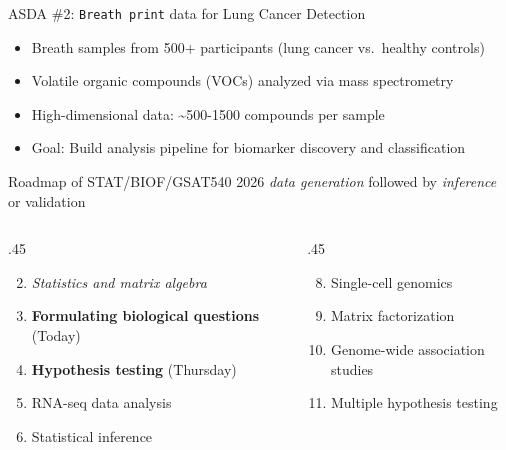 \documentclass[
  12pt,
  ignorenonframetext,
  aspectratio=169]{beamer}
\begin{document}
\begin{frame}{ASDA \#2: \texttt{Breath\ print} data for Lung Cancer
Detection}
\protect{}\label{asda-2-breath-print-data-for-lung-cancer-detection}
\begin{itemize}
\item
  Breath samples from 500+ participants (lung cancer vs.~healthy
  controls)
\item
  Volatile organic compounds (VOCs) analyzed via mass spectrometry
\item
  High-dimensional data: \textasciitilde500-1500 compounds per sample
\item
  Goal: Build analysis pipeline for biomarker discovery and
  classification
\end{itemize}
\end{frame}

\begin{frame}{Roadmap of STAT/BIOF/GSAT540 2026}
\protect{}\label{roadmap-of-statbiofgsat540-2026}
\emph{data generation} followed by \emph{inference} or validation

\vfill

\large

\begin{columns}[T]
\begin{column}{.45\linewidth}
\begin{enumerate}
\setcounter{enumi}{1}
\item
  \emph{Statistics and matrix algebra}
\item
  \textbf{\color{magenta}Formulating biological questions} (Today)
\item
  \textbf{\color{teal} Hypothesis testing} (Thursday)
\item
  RNA-seq data analysis
\item
  Statistical inference
\end{enumerate}
\end{column}

\begin{column}{.45\linewidth}
\begin{enumerate}
\setcounter{enumi}{7}
\item
  Single-cell genomics
\item
  Matrix factorization
\item
  Genome-wide association studies
\item
  Multiple hypothesis testing
\end{enumerate}
\end{column}
\end{columns}

\normalsize
\end{frame}
\end{document}
